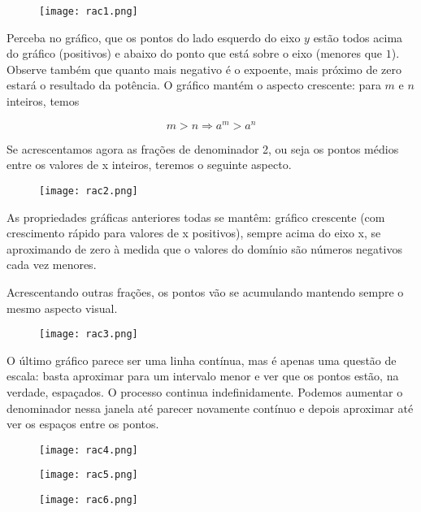 \begin{figure}[H]
\centering
\texttt{[image: rac1.png]}
\end{figure}

Perceba no gráfico, que os pontos do lado esquerdo do eixo $y$ estão todos acima do gráfico (positivos) e abaixo do ponto que está sobre o eixo (menores que $1$). Observe também que quanto mais negativo é o expoente, mais próximo de zero estará o resultado da potência. O gráfico mantém o aspecto crescente: para $m$ e $n$ inteiros, temos

\[
m>n \Rightarrow a^{m}>a^{n}
\]

Se acrescentamos agora as frações de denominador 2, ou seja os pontos médios entre os valores de x inteiros, teremos o seguinte aspecto.

\begin{figure}[H]
\centering
\texttt{[image: rac2.png]}
\end{figure}

As propriedades gráficas anteriores todas se mantêm: gráfico crescente (com crescimento rápido para valores de x positivos), sempre acima do eixo x, se aproximando de zero à medida que o valores do domínio são números negativos cada vez menores.

Acrescentando outras frações, os pontos vão se acumulando mantendo sempre o mesmo aspecto visual.

\begin{figure}[H]
\centering
\texttt{[image: rac3.png]}
\end{figure}

O último gráfico parece ser uma linha contínua, mas é apenas uma questão de escala: basta aproximar para um intervalo menor e ver que os pontos estão, na verdade, espaçados. O processo continua indefinidamente. Podemos aumentar o denominador nessa janela até parecer novamente contínuo e depois aproximar até ver os espaços entre os pontos.

\begin{figure}[H]
\centering
\texttt{[image: rac4.png]}
\end{figure}

\begin{figure}[H]
\centering
\texttt{[image: rac5.png]}
\end{figure}

\begin{figure}[H]
\centering
\texttt{[image: rac6.png]}
\end{figure}

